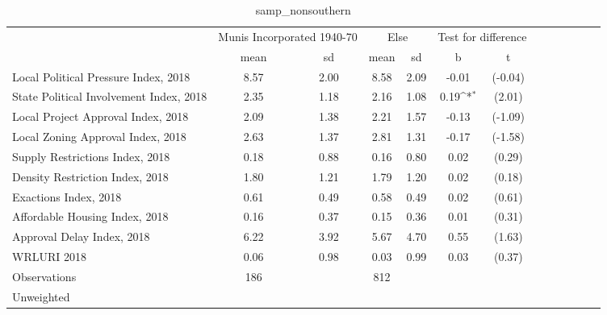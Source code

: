 \begin{table}[htbp]\centering
\def\sym#1{\ifmmode^{#1}\else\(^{#1}\)\fi}
\caption{samp\_nonsouthern \label{tab1}}
\begin{tabular}{l*{3}{cccc}}
\toprule
                    &\multicolumn{2}{c}{Munis Incorporated 1940-70}&\multicolumn{2}{c}{Else} &\multicolumn{2}{c}{Test for difference}\\
                    &        mean&          sd&        mean&          sd&           b         &           t\\
\midrule
Local Political Pressure Index, 2018&        8.57&        2.00&        8.58&        2.09&       -0.01         &     (-0.04)\\
State Political Involvement Index, 2018&        2.35&        1.18&        2.16&        1.08&        0.19\sym{*}  &      (2.01)\\
Local Project Approval Index, 2018&        2.09&        1.38&        2.21&        1.57&       -0.13         &     (-1.09)\\
Local Zoning Approval Index, 2018&        2.63&        1.37&        2.81&        1.31&       -0.17         &     (-1.58)\\
Supply Restrictions Index, 2018&        0.18&        0.88&        0.16&        0.80&        0.02         &      (0.29)\\
Density Restriction Index, 2018&        1.80&        1.21&        1.79&        1.20&        0.02         &      (0.18)\\
Exactions Index, 2018&        0.61&        0.49&        0.58&        0.49&        0.02         &      (0.61)\\
Affordable Housing Index, 2018&        0.16&        0.37&        0.15&        0.36&        0.01         &      (0.31)\\
Approval Delay Index, 2018&        6.22&        3.92&        5.67&        4.70&        0.55         &      (1.63)\\
WRLURI 2018         &        0.06&        0.98&        0.03&        0.99&        0.03         &      (0.37)\\
\midrule
Observations        &         186&            &         812&            &                     &            \\
\bottomrule
\multicolumn{7}{l}{\footnotesize Unweighted}\\
\end{tabular}
\end{table}
